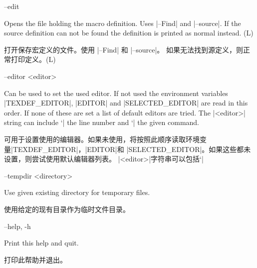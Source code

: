 \documentclass{article}
\newenvironment{options}{%
    \def\cstart{\begingroup\ttfamily\par\noindent\ignorespaces}%
    \def\csep{\endgroup\begingroup\list {}{}\item \relax}%
    \def\cend{\endlist\par\medskip\endgroup\cstart}%
    \cstart
}{%
    \endgroup
}
\begin{document}
\begin{options}
--edit                                             \csep 
Opens the file holding the macro definition. Uses |--Find| and |--source|.
If the source definition can not be found the definition is printed as normal instead. (L)

打开保存宏定义的文件。使用 |--Find| 和 |--source|。 如果无法找到源定义，则正常打印定义。(L)
\cend
\end{options}

\begin{options}
--editor <editor>                                  \csep 
Can be used to set the used editor. If not used the environment variables |TEXDEF_EDITOR|, |EDITOR| and
|SELECTED_EDITOR| are read in this order. If none of these are set a list of default
editors are tried.  The |<editor>| string can include `|%
the line number and `|%
the given command.

可用于设置使用的编辑器。如果未使用，将按照此顺序读取环境变量|TEXDEF_EDITOR|，|EDITOR|和 |SELECTED_EDITOR|。如果这些都未设置，则尝试使用默认编辑器列表。 |<editor>|字符串可以包括`|%
\cend
\end{options}

\begin{options}
--tempdir <directory>                              \csep 
Use given existing directory for temporary files.

使用给定的现有目录作为临时文件目录。
\cend
\end{options}

\begin{options}
--help, -h                                         \csep Print this help and quit.


打印此帮助并退出。
\cend
\end{options}
\end{document}

